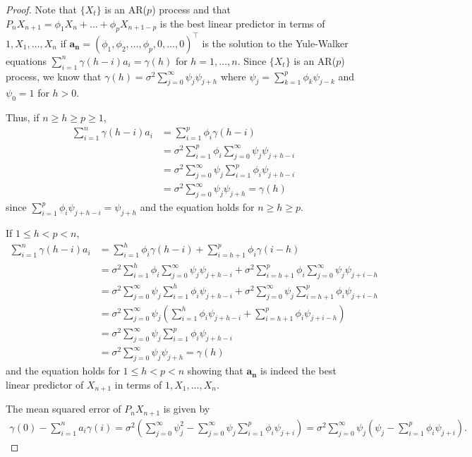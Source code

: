 \documentclass[12pt]{article}
\theoremstyle{definition}
\newcommand{\vect}[1]{\boldsymbol{#1}}
\begin{document}
\begin{proof}
  Note that $\{X_t\}$ is an AR($p$) process and that $P_n X_{n+1} = \phi_1 X_n + \dots + \phi_p X_{n + 1 - p}$
  is the best linear predictor in terms of $1, X_1, \dots, X_n$ if $\vect{a_n} = (\phi_1, \phi_2, \dots, \phi_p, 0, \dots, 0)^{\intercal}$
  is the solution to the Yule-Walker equations $\sum_{i=1}^n \gamma(h-i) a_i = \gamma(h)$
  for $h=1,\dots,n$. Since $\{X_t\}$ is an AR($p$) process, we know that
  $\gamma(h) = \sigma^2 \sum_{j=0}^{\infty} \psi_j \psi_{j+h}$ where $\psi_j = \sum_{k=1}^p \phi_k \psi_{j-k}$
  and $\psi_0 = 1$ for $h > 0$.

  Thus, if $n \geq h \geq p \geq 1$,
  \begin{align*}
    \sum_{i=1}^n \gamma(h-i) a_i &= \sum_{i=1}^p \phi_i \gamma(h-i) \\
    &= \sigma^2 \sum_{i=1}^p \phi_i \sum_{j=0}^\infty \psi_j \psi_{j+h-i} \\
    &= \sigma^2 \sum_{j=0}^\infty \psi_j \sum_{i=1}^p \phi_i \psi_{j+h-i} \\
    &= \sigma^2 \sum_{j=0}^\infty \psi_j \psi_{j+h} = \gamma(h)
  \end{align*}
  since $\sum_{i=1}^p \phi_i \psi_{j+h-i} = \psi_{j+h}$ and the equation holds for $n \geq h \geq p$.

  If $1 \leq h < p < n$,
  \begin{align*}
    \sum_{i=1}^n \gamma(h-i) a_i &= \sum_{i=1}^h \phi_i \gamma(h-i) + \sum_{i=h+1}^p \phi_i \gamma(i-h) \\
    &= \sigma^2 \sum_{i=1}^h \phi_i \sum_{j=0}^\infty \psi_j \psi_{j+h-i} + \sigma^2 \sum_{i=h+1}^p \phi_i \sum_{j=0}^\infty \psi_j \psi_{j+i-h} \\
    &= \sigma^2 \sum_{j=0}^\infty \psi_j \sum_{i=1}^h \phi_i \psi_{j+h-i} + \sigma^2 \sum_{j=0}^\infty \psi_j \sum_{i=h+1}^p \phi_i \psi_{j+i-h}\\
    &= \sigma^2 \sum_{j=0}^\infty \psi_j \left(\sum_{i=1}^h \phi_i \psi_{j+h-i} + \sum_{i=h+1}^p \phi_i \psi_{j+i-h}\right)\\
    &= \sigma^2 \sum_{j=0}^\infty \psi_j \sum_{i=1}^p \phi_i \psi_{j+h-i} \\
    &= \sigma^2 \sum_{j=0}^\infty \psi_j \psi_{j+h} = \gamma(h)
  \end{align*}
  and the equation holds for $1 \leq h < p < n$ showing that $\vect{a_n}$ is
  indeed the best linear predictor of $X_{n+1}$ in terms of $1, X_1, \dots, X_n$.

  The mean squared error of $P_nX_{n+1}$ is given by
  \begin{align*}
    \gamma(0) - \sum_{i=1}^n a_i \gamma(i)
    = \sigma^2\left(\sum_{j=0}^\infty \psi_j^2 - \sum_{j=0}^\infty \psi_j \sum_{i = 1}^p \phi_i \psi_{j+i}\right)
    = \sigma^2\sum_{j=0}^\infty \psi_j \left(\psi_j - \sum_{i = 1}^p \phi_i \psi_{j+i}\right).
  \end{align*}
\end{proof}
\end{document}

